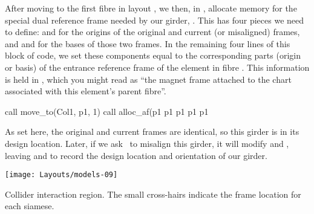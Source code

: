 %
\enlargethispage{\baselineskip}
After moving  to the first fibre in layout , we
then, in , allocate memory for the special dual
reference frame needed by our girder, .%
This has four pieces we need to define:  and  for
the origins of the original and current (or misaligned) frames,
and  and  for the bases of those two frames.%
In the remaining four lines of this block of code, we set these
components equal to the corresponding parts (origin or basis) of
the entrance reference frame of the element in fibre .
This information is held in ,
which you might read as ``the magnet frame attached to the chart
associated with this element's parent fibre''.
%
\begin{ptccode}
call move_to(Col1, p1, 1)
call alloc_af(p1%
p1%
p1%
p1%
p1%
\end{ptccode}
%
As set here, the original and current frames are identical,
so this girder is in its design location. Later, if we ask
\PTC\ to misalign this girder, it will modify 
and , leaving  and
 to record the design location and
orientation of our girder.

\begin{MarginFigure}[2\baselineskip]
  \texttt{[image: Layouts/models-09]}
  \caption{Collider interaction region. The small cross-hairs
           indicate the frame location for each siamese.}
  \label{fig:col.siamfr}
\end{MarginFigure}

